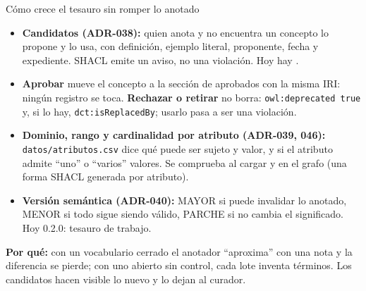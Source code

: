 \documentclass[aspectratio=169,10pt]{beamer}
\newcommand{\ttt}[1]{\texttt{\small #1}}
\newcommand{\cifra}[1]{\textbf{\alert{#1}}}
\newcommand{\porque}[1]{\par\smallskip\colorbox{ocre!10}{\parbox{\dimexpr\linewidth-2\fboxsep}{\footnotesize\textbf{Por qué:} #1}}}
\begin{document}
\begin{frame}{Cómo crece el tesauro sin romper lo anotado}
\small
\begin{itemize}
\item \textbf{Candidatos (ADR-038):} quien anota y no encuentra un concepto lo \alert{propone y lo usa}, con
      definición, ejemplo literal, proponente, fecha y expediente. SHACL emite un \alert{aviso}, no una violación.
      Hoy hay \cifra{\cifraCandidatos}.
\item \textbf{Aprobar} mueve el concepto a la sección de aprobados con la misma IRI: ningún registro se toca.
      \textbf{Rechazar o retirar} no borra: \ttt{owl:deprecated true} y, si lo hay, \ttt{dct:isReplacedBy}; usarlo pasa a
      ser una violación.
\item \textbf{Dominio, rango y cardinalidad por atributo (ADR-039, 046):} \ttt{datos/atributos.csv} dice qué puede ser
      sujeto y valor, y si el atributo admite \enquote{uno} o \enquote{varios} valores. Se comprueba al cargar y en el grafo
      (una forma SHACL generada por atributo).
\item \textbf{Versión semántica (ADR-040):} MAYOR si puede invalidar lo anotado, MENOR si todo sigue siendo válido,
      PARCHE si no cambia el significado. Hoy 0.2.0: tesauro de trabajo.
\end{itemize}
\porque{con un vocabulario cerrado el anotador \enquote{aproxima} con una nota y la diferencia se pierde; con uno abierto
sin control, cada lote inventa términos. Los candidatos hacen visible lo nuevo y lo dejan al curador.}
\end{frame}
\end{document}
